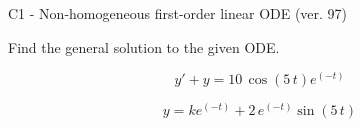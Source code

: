 \begin{exercise}
  \begin{exerciseTitle}C1 - Non-homogeneous first-order linear ODE (ver. 97)\end{exerciseTitle}
  \begin{exerciseStatement}
    
Find the general solution to the given ODE.

    
\[y'+y= 10 \, \cos\left(5 \, t\right) e^{\left(-t\right)}\]

  \end{exerciseStatement}
  \begin{exerciseAnswer}
    
\[y= k e^{\left(-t\right)} + 2 \, e^{\left(-t\right)} \sin\left(5 \, t\right)\]

  \end{exerciseAnswer}
\end{exercise}